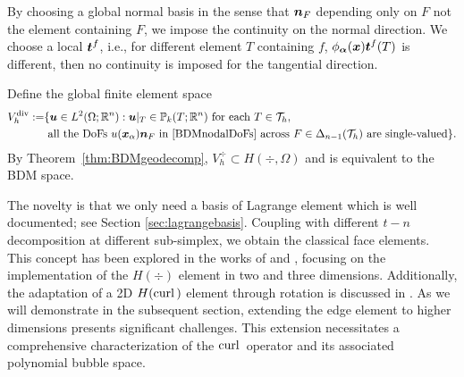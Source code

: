 \documentclass[mathpazo]{cicp}
\begin{document}
By choosing a global normal basis in the sense that $\boldsymbol n_F$ depending only on $F$ not the element containing $F$, we impose the continuity on the normal direction. We choose a local $\boldsymbol t^f$, i.e., for different element $T$ containing $f$, $\phi_{\boldsymbol\alpha}(\boldsymbol x)\boldsymbol t^f(T)$
is different, then no continuity is imposed for the tangential direction. 

Define the global finite element space
\begin{align*}
V_h^{\operatorname{div}}:=&\{\boldsymbol u\in L^2(\Omega;\mathbb R^n): \boldsymbol u|_T\in\mathbb P_k(T; \mathbb R^n) \textrm{ for each } T\in\mathcal T_h, \\
 &\textrm{ all the DoFs } u(\boldsymbol x_{\alpha})\boldsymbol n_F \text{ in \eqref{BDMnodalDoFs} across $F\in\Delta_{n-1}(\mathcal T_h)$ are single-valued}\}.
\end{align*}
By Theorem~\ref{thm:BDMgeodecomp}, $V_h^{\div}\subset H(\div,\Omega)$ and is equivalent to the BDM space.

The novelty is that we only need a basis of Lagrange element which is well documented; see Section \ref{sec:lagrangebasis}. Coupling with different $t-n$ decomposition at different sub-simplex, we obtain the classical face elements. This concept has been explored in the works of \cite{DeSiqueiraDevlooGomes2010, DeSiqueiraDevlooGomes2013} and \cite{CastroDevlooFariasGomesEtAl2016}, focusing on the implementation of the $H(\div)$ element in two and three dimensions. Additionally, the adaptation of a 2D $H({\rm curl\,})$ element through rotation is discussed in \cite{DeSiqueiraDevlooGomes2010, DeSiqueiraDevlooGomes2013}. As we will demonstrate in the subsequent section, extending the edge element to higher dimensions presents significant challenges. This extension necessitates a comprehensive characterization of the ${\rm curl\,}$ operator and its associated polynomial bubble space.
\end{document}
